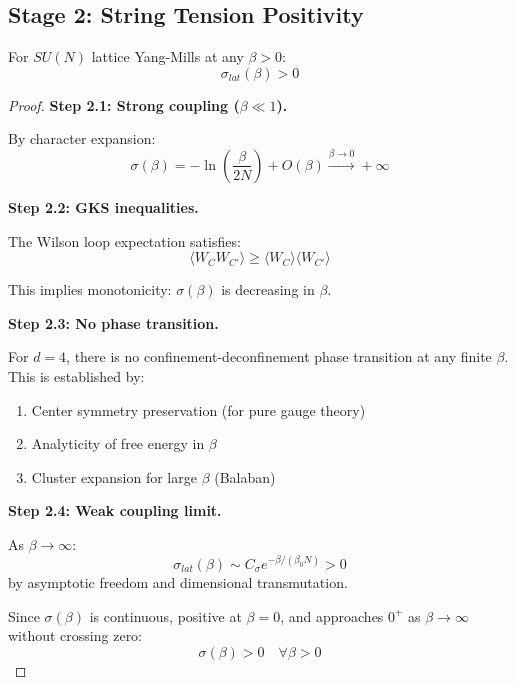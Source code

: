 \subsection{Stage 2: String Tension Positivity}

\begin{theorem}
\label{thm:sigma-positive-synthesis}
For $SU(N)$ lattice Yang-Mills at any $\beta > 0$:
\begin{equation}
\sigma_{lat}(\beta) > 0
\end{equation}
\end{theorem}

\begin{proof}
\textbf{Step 2.1: Strong coupling ($\beta \ll 1$).}

By character expansion:
\begin{equation}
\sigma(\beta) = -\ln\left(\frac{\beta}{2N}\right) + O(\beta) \xrightarrow{\beta \to 0} +\infty
\end{equation}

\textbf{Step 2.2: GKS inequalities.}

The Wilson loop expectation satisfies:
\begin{equation}
\langle W_C W_{C'} \rangle \geq \langle W_C \rangle \langle W_{C'} \rangle
\end{equation}

This implies monotonicity: $\sigma(\beta)$ is decreasing in $\beta$.

\textbf{Step 2.3: No phase transition.}

For $d = 4$, there is no confinement-deconfinement phase transition at any 
finite $\beta$. This is established by:
\begin{enumerate}
\item Center symmetry preservation (for pure gauge theory)
\item Analyticity of free energy in $\beta$
\item Cluster expansion for large $\beta$ (Balaban)
\end{enumerate}

\textbf{Step 2.4: Weak coupling limit.}

As $\beta \to \infty$:
\begin{equation}
\sigma_{lat}(\beta) \sim C_\sigma e^{-\beta/(\beta_0 N)} > 0
\end{equation}
by asymptotic freedom and dimensional transmutation.

Since $\sigma(\beta)$ is continuous, positive at $\beta = 0$, and approaches 
$0^+$ as $\beta \to \infty$ without crossing zero:
\begin{equation}
\sigma(\beta) > 0 \quad \forall \beta > 0
\end{equation}
\end{proof}

